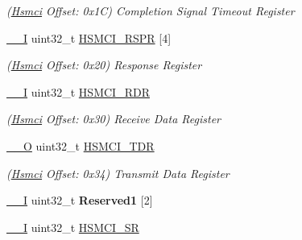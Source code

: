 \begin{DoxyCompactItemize}
\begin{DoxyCompactList}\small\item\em (\mbox{\hyperlink{structHsmci}{Hsmci}} Offset\+: 0x1C) Completion Signal Timeout Register \end{DoxyCompactList}\item 
\mbox{\label{structHsmci_a94878c9186626d34e9852fa3db8ed9e1}} 
\mbox{\hyperlink{core__cm7_8h_af63697ed9952cc71e1225efe205f6cd3}{\+\_\+\+\_\+I}} uint32\+\_\+t \mbox{\hyperlink{structHsmci_a94878c9186626d34e9852fa3db8ed9e1}{H\+S\+M\+C\+I\+\_\+\+R\+S\+PR}} \mbox{[}4\mbox{]}
\begin{DoxyCompactList}\small\item\em (\mbox{\hyperlink{structHsmci}{Hsmci}} Offset\+: 0x20) Response Register \end{DoxyCompactList}\item 
\mbox{\label{structHsmci_ae2fa33721d0b087e1ad987375166a51d}} 
\mbox{\hyperlink{core__cm7_8h_af63697ed9952cc71e1225efe205f6cd3}{\+\_\+\+\_\+I}} uint32\+\_\+t \mbox{\hyperlink{structHsmci_ae2fa33721d0b087e1ad987375166a51d}{H\+S\+M\+C\+I\+\_\+\+R\+DR}}
\begin{DoxyCompactList}\small\item\em (\mbox{\hyperlink{structHsmci}{Hsmci}} Offset\+: 0x30) Receive Data Register \end{DoxyCompactList}\item 
\mbox{\label{structHsmci_ae2acc8fa5c27537de564b745cc15dbc3}} 
\mbox{\hyperlink{core__cm7_8h_a7e25d9380f9ef903923964322e71f2f6}{\+\_\+\+\_\+O}} uint32\+\_\+t \mbox{\hyperlink{structHsmci_ae2acc8fa5c27537de564b745cc15dbc3}{H\+S\+M\+C\+I\+\_\+\+T\+DR}}
\begin{DoxyCompactList}\small\item\em (\mbox{\hyperlink{structHsmci}{Hsmci}} Offset\+: 0x34) Transmit Data Register \end{DoxyCompactList}\item 
\mbox{\label{structHsmci_a4aca6150a9880fb70814970fd45521e8}} 
\mbox{\hyperlink{core__cm7_8h_af63697ed9952cc71e1225efe205f6cd3}{\+\_\+\+\_\+I}} uint32\+\_\+t {\bfseries Reserved1} \mbox{[}2\mbox{]}
\item 
\mbox{\label{structHsmci_a0a9d96440af81fd3525d10b41b8e7013}} 
\mbox{\hyperlink{core__cm7_8h_af63697ed9952cc71e1225efe205f6cd3}{\+\_\+\+\_\+I}} uint32\+\_\+t \mbox{\hyperlink{structHsmci_a0a9d96440af81fd3525d10b41b8e7013}{H\+S\+M\+C\+I\+\_\+\+SR}}

\end{DoxyCompactItemize}

